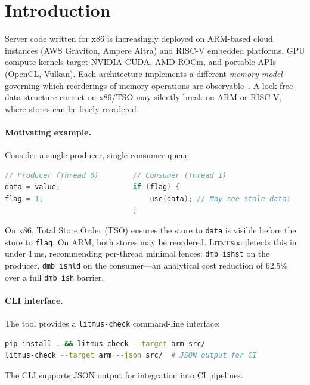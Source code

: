 \documentclass[11pt]{article}
\newcommand{\litmus}{\textsc{Litmus$\infty$}}
\begin{document}
\section{Introduction}
\label{sec:intro}

Server code written for x86 is increasingly deployed on ARM-based
cloud instances (AWS Graviton, Ampere Altra) and RISC-V embedded
platforms. GPU compute kernels target NVIDIA CUDA, AMD ROCm, and
portable APIs (OpenCL, Vulkan). Each architecture implements a
different \emph{memory model} governing which reorderings of
memory operations are observable~\cite{Adve2010, Alglave2014}.
A lock-free data structure correct on x86/TSO may silently break
on ARM or RISC-V, where stores can be freely reordered.

\paragraph{Motivating example.}
Consider a single-producer, single-consumer queue:

\begin{lstlisting}[language=C, caption={Message passing: safe on x86, broken on ARM.}]
// Producer (Thread 0)        // Consumer (Thread 1)
data = value;                 if (flag) {
flag = 1;                         use(data); // May see stale data!
                              }
\end{lstlisting}

\noindent
On x86, Total Store Order (TSO) ensures the store to \texttt{data}
is visible before the store to \texttt{flag}. On ARM, both stores
may be reordered. \litmus{} detects this in under 1\,ms, recommending
per-thread minimal fences: \texttt{dmb ishst} on the producer,
\texttt{dmb ishld} on the consumer---an analytical cost reduction
of 62.5\% over a full \texttt{dmb ish} barrier.

\paragraph{CLI interface.}
\label{sec:cicd}
The tool provides a \texttt{litmus-check} command-line interface:

\begin{lstlisting}[language=bash, numbers=none]
pip install . && litmus-check --target arm src/
litmus-check --target arm --json src/  # JSON output for CI
\end{lstlisting}

\noindent
The CLI supports JSON output for integration into CI pipelines.
\end{document}
